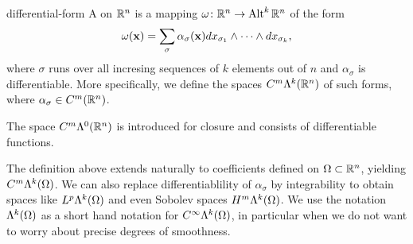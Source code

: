 \begin{Definition}{differential-form}
  A  on $\mathbb R^n$ is a mapping
  $\omega\colon \mathbb R^n \to \operatorname{Alt}^k\mathbb R^n$ of the form
  \begin{gather}
    \omega(\mathbf x) = \sum_{\sigma} \alpha_{\sigma}(\mathbf x)
    dx_{\sigma_1}\wedge\dots\wedge dx_{\sigma_k},
  \end{gather}
  where $\sigma$ runs over all incresing sequences of $k$ elements out
  of $n$ and $\alpha_\sigma$ is differentiable. More specifically, we
  define the spaces $C^m\Lambda^k(\mathbb R^n)$ of such forms, where
  $\alpha_\sigma \in C^m(\mathbb R^n)$.

  The space $C^m\Lambda^0(\mathbb R^n)$ is introduced for closure and
  consists of differentiable functions.
\end{Definition}

\begin{remark}
  The definition above extends naturally to coefficients defined on
  $\Omega\subset\mathbb R^n$, yielding $C^m\Lambda^k(\Omega)$. We can also
  replace differentiablility of $\alpha_\sigma$ by integrability to
  obtain spaces like $L^p\Lambda^k(\Omega)$ and even Sobolev spaces
  $H^m\Lambda^k(\Omega)$. We use the notation
   $\Lambda^k(\Omega)$ as a short hand
  notation for $C^\infty\Lambda^k(\Omega)$, in particular when we do
  not want to worry about precise degrees of smoothness.
\end{remark}

